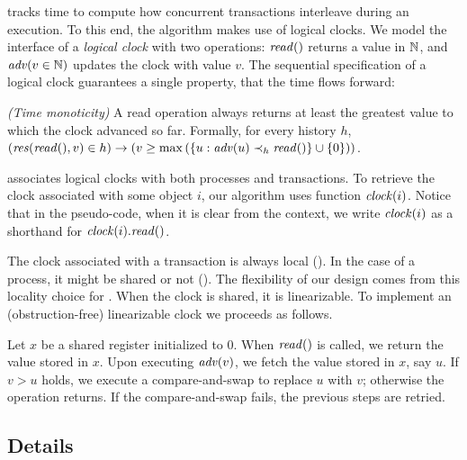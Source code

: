 
 tracks time to compute how concurrent transactions interleave during an execution.
To this end, the algorithm makes use of logical clocks.
We model the interface of a \emph{logical clock} with two operations: $\cread$ returns a value in $\naturalSet$, and $\cadv(v \in \naturalSet)$ updates the clock with value $v$.
The sequential specification of a logical clock guarantees a single property, that the time flows forward:
\begin{inparaenum}
\item[\emph{(Time monoticity)}]
  A read operation always returns at least the greatest value to which the clock advanced so far.
  Formally, for every history $h$, $(\responseAny{\cread}{v} \in h) \implies (v \geq \max{(\{u : \cadv(u) \hb_h \cread \} \union \{0\})})$.
\end{inparaenum}

 associates logical clocks with both processes and transactions.
To retrieve the clock associated with some object $i$, our algorithm uses function $\clockOf{i}$.
Notice that in the pseudo-code, when it is clear from the context, 
we write $\clockOf{i}$ as a shorthand for $\clockOf{i}.\mathit{read}()$.

The clock associated with a transaction is always local ().
In the case of a process, it might be shared or not ().
The flexibility of our design comes from this locality choice for .
When the clock is shared, it is linearizable.
To implement an (obstruction-free) linearizable clock we proceeds as follows.
\begin{construction}
  Let $x$ be a shared register initialized to $0$.
  When $\cread$ is called, we return the value stored in $x$.
  Upon executing $\cadv(v)$, we fetch the value stored in $x$, say $u$.
  If $v > u$ holds, we execute a compare-and-swap to replace $u$ with $v$; 
  otherwise the operation returns.
  If the compare-and-swap fails, the previous steps are retried.
\end{construction}



\subsection{Details}

